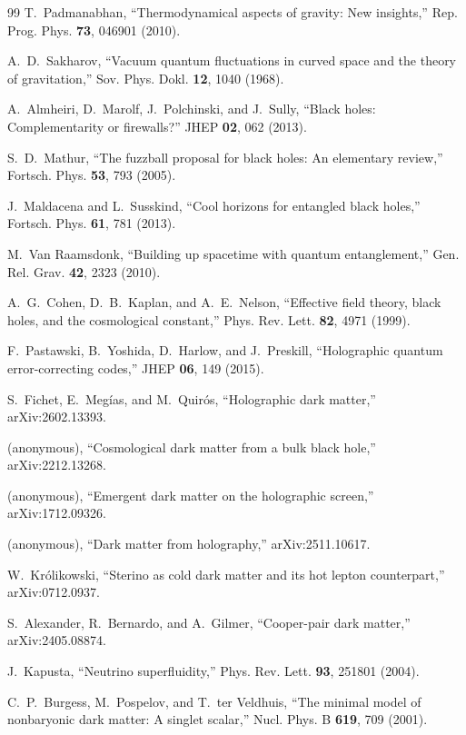 \documentclass[11pt,a4paper]{article}
\begin{document}
\begin{thebibliography}{99}
 T.~Padmanabhan, ``Thermodynamical aspects of gravity: New insights,'' Rep. Prog. Phys. \textbf{73}, 046901 (2010).

 A.~D.~Sakharov, ``Vacuum quantum fluctuations in curved space and the theory of gravitation,'' Sov. Phys. Dokl. \textbf{12}, 1040 (1968).

 A.~Almheiri, D.~Marolf, J.~Polchinski, and J.~Sully, ``Black holes: Complementarity or firewalls?'' JHEP \textbf{02}, 062 (2013).

 S.~D.~Mathur, ``The fuzzball proposal for black holes: An elementary review,'' Fortsch. Phys. \textbf{53}, 793 (2005).

 J.~Maldacena and L.~Susskind, ``Cool horizons for entangled black holes,'' Fortsch. Phys. \textbf{61}, 781 (2013).

 M.~Van Raamsdonk, ``Building up spacetime with quantum entanglement,'' Gen. Rel. Grav. \textbf{42}, 2323 (2010).

 A.~G.~Cohen, D.~B.~Kaplan, and A.~E.~Nelson, ``Effective field theory, black holes, and the cosmological constant,'' Phys. Rev. Lett. \textbf{82}, 4971 (1999).

 F.~Pastawski, B.~Yoshida, D.~Harlow, and J.~Preskill, ``Holographic quantum error-correcting codes,'' JHEP \textbf{06}, 149 (2015).

 S.~Fichet, E.~Megías, and M.~Quirós, ``Holographic dark matter,'' arXiv:2602.13393.

 (anonymous), ``Cosmological dark matter from a bulk black hole,'' arXiv:2212.13268.

 (anonymous), ``Emergent dark matter on the holographic screen,'' arXiv:1712.09326.

 (anonymous), ``Dark matter from holography,'' arXiv:2511.10617.

 W.~Królikowski, ``Sterino as cold dark matter and its hot lepton counterpart,'' arXiv:0712.0937.

 S.~Alexander, R.~Bernardo, and A.~Gilmer, ``Cooper-pair dark matter,'' arXiv:2405.08874.

 J.~Kapusta, ``Neutrino superfluidity,'' Phys. Rev. Lett. \textbf{93}, 251801 (2004).

 C.~P.~Burgess, M.~Pospelov, and T.~ter Veldhuis, ``The minimal model of nonbaryonic dark matter: A singlet scalar,'' Nucl. Phys. B \textbf{619}, 709 (2001).


\end{thebibliography}
\end{document}
